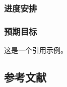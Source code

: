 \bullshit

\subsubsection{进度安排}

\bullshit

\subsubsection{预期目标}

\bullshit

这是一个引用示例\cite{vaswani2017attention}。

{
\newpage

\subsection{参考文献}
{\normalfont{}\setlength{\baselineskip}{14pt}
\renewcommand{\refname}{\vspace{-\baselineskip}}
}
}